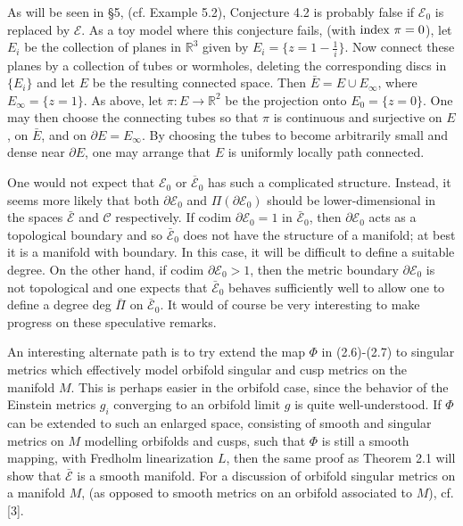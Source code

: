\documentclass[11pt,amsfonts]{amsart}
\begin{document}
  As will be seen in \S 5, (cf. Example 5.2), Conjecture 4.2 is probably 
false if ${\mathcal E}_{0}$ is replaced by ${\mathcal E}$. As a toy model 
where this conjecture fails, (with ${\rm index} \ \pi = 0$), let $E_{i}$ 
be the collection of planes in ${\mathbb R}^{3}$ given by $E_{i} = 
\{z = 1 - \frac{1}{i}\}$. Now connect these planes by a collection of tubes 
or wormholes, deleting the corresponding discs in $\{E_{i}\}$ and let $E$ be 
the resulting connected space. Then $\bar E = E \cup E_{\infty}$, where 
$E_{\infty} = \{z = 1\}$. As above, let $\pi: E \rightarrow {\mathbb R}^{2}$ 
be the projection onto $E_{0} = \{z = 0\}$. One may then choose the connecting 
tubes so that $\pi$ is continuous and surjective on $E$, on $\bar E$, and on 
$\partial E = E_{\infty}$. By choosing the tubes to become arbitrarily small 
and dense near $\partial E$, one may arrange that $E$ is uniformly locally 
path connected. 

  One would not expect that ${\mathcal E}_{0}$ or $\overline{\mathcal E}_{0}$ 
has such a complicated structure. Instead, it seems more likely that both 
$\partial{\mathcal E}_{0}$ and $\Pi(\partial{\mathcal E}_{0})$ should be 
lower-dimensional in the spaces $\bar{\mathcal E}$ and ${\mathcal C}$ respectively. 
If codim $\partial{\mathcal E}_{0} = 1$ in $\bar{\mathcal E}_{0}$, then 
$\partial{\mathcal E}_{0}$ acts as a topological boundary and so 
$\bar{\mathcal E}_{0}$ does not have the structure of a manifold; at best 
it is a manifold with boundary. In this case, it will be difficult to define 
a suitable degree. On the other hand, if codim $\partial{\mathcal E}_{0} > 1$, 
then the metric boundary $\partial{\mathcal E}_{0}$ is not topological and one 
expects that $\bar{\mathcal E}_{0}$ behaves sufficiently well to allow one to 
define a degree deg $\bar{\Pi}$ on $\bar{\mathcal E}_{0}$. It would of course 
be very interesting to make progress on these speculative remarks. 

\medskip

 An interesting alternate path is to try extend the map $\Phi$ in 
(2.6)-(2.7) to singular metrics which effectively model orbifold 
singular and cusp metrics on the manifold $M$. This is perhaps 
easier in the orbifold case, since the behavior of the Einstein metrics 
$g_{i}$ converging to an orbifold limit $g$ is quite well-understood. 
If $\Phi$ can be extended to such an enlarged space, consisting of 
smooth and singular metrics on $M$ modelling orbifolds and cusps, such 
that $\Phi$ is still a smooth mapping, with Fredholm linearization $L$, 
then the same proof as Theorem 2.1 will show that $\bar{\mathcal E}$ is 
a smooth manifold. For a discussion of orbifold singular metrics on a 
manifold $M$, (as opposed to smooth metrics on an orbifold associated to 
$M$), cf. [3]. 
\end{document}
